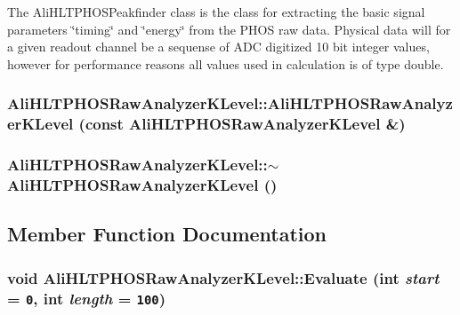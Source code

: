 The Ali\-HLTPHOSPeakfinder class is the class for extracting the basic signal parameters \char`\"{}timing\char`\"{} and \char`\"{}energy\char`\"{} from the PHOS raw data. Physical data will for a given readout channel be a sequense of ADC digitized 10 bit integer values, however for performance reasons all values used in calculation is of type double. 
\subsubsection{\setlength{\rightskip}{0pt plus 5cm}Ali\-HLTPHOSRaw\-Analyzer\-KLevel::Ali\-HLTPHOSRaw\-Analyzer\-KLevel (const {\bf Ali\-HLTPHOSRaw\-Analyzer\-KLevel} \&)}\label{classAliHLTPHOSRawAnalyzerKLevel_a1}


\subsubsection{\setlength{\rightskip}{0pt plus 5cm}Ali\-HLTPHOSRaw\-Analyzer\-KLevel::$\sim${\bf Ali\-HLTPHOSRaw\-Analyzer\-KLevel} ()\hspace{0.3cm}{\tt  [virtual]}}\label{classAliHLTPHOSRawAnalyzerKLevel_a3}




\subsection{Member Function Documentation}
\subsubsection{\setlength{\rightskip}{0pt plus 5cm}void Ali\-HLTPHOSRaw\-Analyzer\-KLevel::Evaluate (int {\em start} = {\tt 0}, int {\em length} = {\tt 100})\hspace{0.3cm}{\tt  [virtual]}}\label{classAliHLTPHOSRawAnalyzerKLevel_a4}


